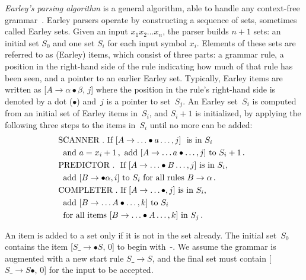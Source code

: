 \begin{multicols}{2}
     \textit{Earley's parsing algorithm} is a general algorithm, able to handle any 
context-free grammar~\cite{15-koz}. Earley parsers operate by constructing a 
sequence of sets, sometimes called Earley sets. Given an input $x_1x_2\ldots x_n$, the 
parser builds $n+1$ sets: an initial set $S_0$ and one set $S_i$ for each input symbol 
$x_i$. Elements of these sets are referred to as (Earley) items, which consist of three 
parts: a grammar rule, a position in the right-hand side of the rule indicating how 
much of that rule has been seen, and a pointer to an earlier Earley set. Typically, 
Earley items are written as [$A\rightarrow \alpha\bullet\beta,\,j$] where the 
position in the rule's right-hand side is denoted by a dot ($\bullet$) and~$j$ is a 
pointer to set~$S_j$. An Earley set~$S_i$ is computed from an initial set of Earley 
items in~$S_i$, and $S_i+1$ is initialized, by applying the following three steps to 
the items in~$S_i$ until no more can be added:
\begin{align*}
    &\hspace*{-2mm}\mbox{SCANNER\ }.\ \mbox{If\ } [A \rightarrow \ldots \bullet a \ldots , j]\
    \mbox{\ is in\ } S_i\\
    & \mbox{and\ } a = x_i+1\,, \mbox{\ add\ } [A\rightarrow \ldots a \bullet \ldots , j] \mbox{\ to\ } S_i+1\,.\\
 &    \hspace*{-2mm}\mbox{PREDICTOR\ }.\  \mbox{\ If\ } [A \rightarrow \ldots \bullet B \ldots , j] 
 \mbox{\ is in\ } S_i,\\
 & \mbox{add\ } [B \rightarrow \bullet\alpha, i] \mbox{\ to\ } S_i \mbox{\ for all 
rules\ } B \rightarrow \alpha\,.\\
& \hspace*{-2mm}\mbox{COMPLETER\ }. \mbox{\ If\ } [A \rightarrow \ldots \bullet, j] \mbox{\ is in\ } S_i,\\ 
&\mbox{add\ } [B \rightarrow \ldots A \bullet \ldots , k] \mbox{\ to\ } S_i\\
&\mbox{for all 
items\ } [B \rightarrow \ldots \bullet  A \ldots , k] \mbox{\ in\ } S_j\,.
\end{align*}
     
     An item is added to a set only if it is not in the set already. The initial 
set~$S_0$ contains the item [$S\_ \rightarrow \bullet S,\,0$] to begin with~-.
We 
assume the grammar is augmented with a new start rule $S\_ \rightarrow S$, and 
the final set must contain [$S\_\rightarrow S\bullet,\,0$] for the input to be 
accepted. 
     

\end{multicols}
